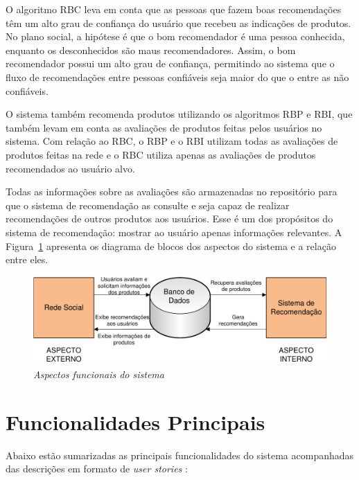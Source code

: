  O algoritmo RBC leva em conta que as pessoas que fazem boas recomendações têm um alto grau de confiança do usuário que recebeu as indicações de produtos. No plano social, a hipótese é que o bom recomendador é uma pessoa conhecida, enquanto os desconhecidos são maus recomendadores. Assim, o bom recomendador possui um alto grau de confiança, permitindo ao sistema que o fluxo de recomendações entre pessoas confiáveis seja maior do que o entre as não confiáveis.
 
 O sistema também recomenda produtos utilizando os algoritmos RBP e RBI, que também levam em conta as avaliações de produtos feitas pelos usuários no sistema. Com relação ao RBC, o RBP e o RBI utilizam todas as avaliações de produtos feitas na rede e o RBC utiliza apenas as avaliações de produtos recomendados ao usuário alvo.
 
 Todas as informações sobre as avaliações são armazenadas no repositório para que o sistema de recomendação as consulte e seja capaz de realizar recomendações de outros produtos aos usuários. Esse é um dos propósitos do sistema de recomendação: mostrar ao usuário apenas informações relevantes. A Figura~\ref{fig:aspectos_funcionais} apresenta os diagrama de blocos dos aspectos do sistema e a relação entre eles.
 
\begin{figure}
 \centering
 \includegraphics[width=\textwidth]{imagens/Implementacao_Detalhe2}
 \caption{\it Aspectos funcionais do sistema}
 \label{fig:aspectos_funcionais}
\end{figure}

\section{Funcionalidades Principais} %
\label{sec:funcionalidades_principais}

Abaixo estão sumarizadas as principais funcionalidades do sistema acompanhadas das descrições em formato de \textit{user stories} \cite{557458}:


